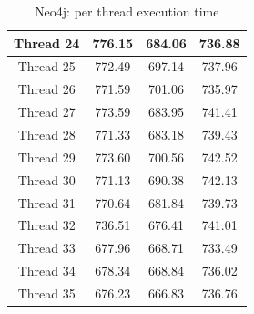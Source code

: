 \begin{table}[h!]
{\begin{minipage}[b]{80mm}
\begin{tabular}{|c|c|c|c|}
Thread	24	&  776.15	&	684.06 &	736.88   \\ 
 \hline 
Thread	25	&  772.49	&	697.14 &	737.96   \\ 
 \hline 
Thread	26	&  771.59	&	701.06 &	735.97   \\ 
 \hline 
Thread	27	&  773.59	&	683.95 &	741.41   \\ 
 \hline 
Thread	28	&  771.33	&	683.18 &	739.43   \\ 
 \hline 
Thread	29	&  773.60	&	700.56 &	742.52   \\ 
 \hline 
Thread	30	&  771.13	&	690.38 &	742.13   \\ 
 \hline 
Thread	31	&  770.64	&	681.84 &	739.73   \\ 
 \hline 
Thread	32	&  736.51	&	676.41 &	741.01   \\ 
 \hline 
Thread	33	&  677.96	&	668.71 &	733.49   \\ 
 \hline 
Thread	34	&  678.34	&	668.84 &	736.02   \\ 
 \hline 
Thread	35	&  676.23	&	666.83 &	736.76   \\ 
 \hline 
\end{tabular}
\caption{Neo4j: per thread execution time}
\label{table:neo4j}
\end{minipage}

}
\end{table}
